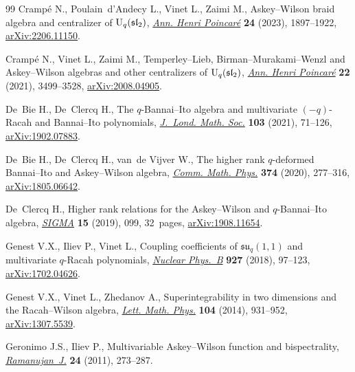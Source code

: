 \documentclass[10pt,a4paper]{amsart}
\numberwithin{equation}{section}
\theoremstyle{definition}
\begin{document}
\begin{thebibliography}{99}
Cramp\'e N., Poulain~d'Andecy L., Vinet L., Zaimi M., Askey--{W}ilson braid
 algebra and centralizer of {${\rm U}_q(\mathfrak{sl}_2)$}, \href{https://doi.org/10.1007/s00023-023-01275-4}{\textit{Ann. Henri
 Poincar\'e}} \textbf{24} (2023), 1897--1922, \href{https://arxiv.org/abs/2206.11150}{arXiv:2206.11150}.

Cramp\'e N., Vinet L., Zaimi M., Temperley--{L}ieb,
 {B}irman--{M}urakami--{W}enzl and {A}skey--{W}ilson algebras and other
 centralizers of {${\rm U}_q(\mathfrak{sl}_2)$}, \href{https://doi.org/10.1007/s00023-021-01064-x}{\textit{Ann. Henri Poincar\'e}}
 \textbf{22} (2021), 3499--3528, \href{https://arxiv.org/abs/2008.04905}{arXiv:2008.04905}.

De~Bie H., De~Clercq H., The {$q$}-{B}annai--{I}to algebra and multivariate
 {$(-q)$}-{R}acah and {B}annai--{I}to polynomials, \href{https://doi.org/10.1112/jlms.12367}{\textit{J.~Lond. Math.
 Soc.}} \textbf{103} (2021), 71--126, \href{https://arxiv.org/abs/1902.07883}{arXiv:1902.07883}.

De~Bie H., De~Clercq H., van~de Vijver W., The higher rank {$q$}-deformed
 {B}annai--{I}to and {A}skey--{W}ilson algebra, \href{https://doi.org/10.1007/s00220-019-03562-w}{\textit{Comm. Math. Phys.}}
 \textbf{374} (2020), 277--316, \href{https://arxiv.org/abs/1805.06642}{arXiv:1805.06642}.

De~Clercq H., Higher rank relations for the {A}skey--{W}ilson and
 {$q$}-{B}annai--{I}to algebra, \href{https://doi.org/10.3842/SIGMA.2019.099}{\textit{SIGMA}} \textbf{15} (2019), 099,
 32~pages, \href{https://arxiv.org/abs/1908.11654}{arXiv:1908.11654}.

Genest V.X., Iliev P., Vinet L., Coupling coefficients of
 {$\mathfrak{su}_q(1,1)$} and multivariate {$q$}-{R}acah polynomials,
 \href{https://doi.org/10.1016/j.nuclphysb.2017.12.009}{\textit{Nuclear Phys.~B}} \textbf{927} (2018), 97--123, \href{https://arxiv.org/abs/1702.04626}{arXiv:1702.04626}.

Genest V.X., Vinet L., Zhedanov A., Superintegrability in two dimensions and
 the {R}acah--{W}ilson algebra, \href{https://doi.org/10.1007/s11005-014-0697-y}{\textit{Lett. Math. Phys.}} \textbf{104}
 (2014), 931--952, \href{https://arxiv.org/abs/1307.5539}{arXiv:1307.5539}.

Geronimo J.S., Iliev P., Multivariable {A}skey--{W}ilson function and
 bispectrality, \href{https://doi.org/10.1007/s11139-010-9244-3}{\textit{Ramanujan~J.}} \textbf{24} (2011), 273--287.


\end{thebibliography}
\end{document}
